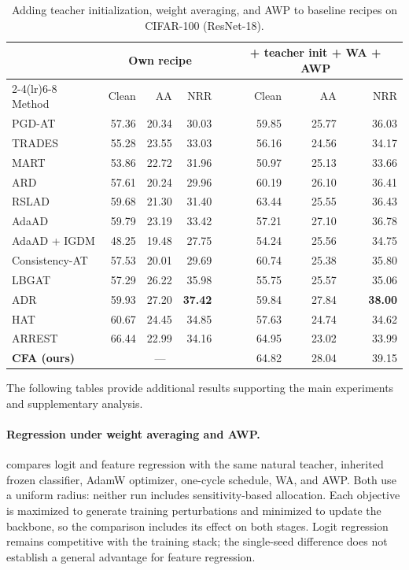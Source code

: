 \begin{table}[!htbp]
  \centering
  \scriptsize
  \setlength{\tabcolsep}{4pt}
  \caption{
  Adding teacher initialization, weight averaging, and AWP to baseline
  recipes on CIFAR-100 (ResNet-18).
  }
  \label{tab:baselinestack}
  \begin{tabular}{lrrrcrrr}
    \toprule
    & \multicolumn{3}{c}{Own recipe}
    && \multicolumn{3}{c}{+ teacher init + WA + AWP} \\
    \cmidrule(lr){2-4}\cmidrule(lr){6-8}
    Method & Clean & AA & NRR && Clean & AA & NRR \\
    \midrule
    PGD-AT & 57.36 & 20.34 & 30.03
           && 59.85 & 25.77 & 36.03 \\
    TRADES & 55.28 & 23.55 & 33.03
           && 56.16 & 24.56 & 34.17 \\
    MART & 53.86 & 22.72 & 31.96
         && 50.97 & 25.13 & 33.66 \\
    ARD & 57.61 & 20.24 & 29.96
        && 60.19 & 26.10 & 36.41 \\
    RSLAD & 59.68 & 21.30 & 31.40
          && 63.44 & 25.55 & 36.43 \\
    AdaAD & 59.79 & 23.19 & 33.42
          && 57.21 & 27.10 & 36.78 \\
    AdaAD + IGDM & 48.25 & 19.48 & 27.75
                 && 54.24 & 25.56 & 34.75 \\
    Consistency-AT & 57.53 & 20.01 & 29.69
                   && 60.74 & 25.38 & 35.80 \\
    LBGAT & 57.29 & 26.22 & 35.98
          && 55.75 & 25.57 & 35.06 \\
    ADR & 59.93 & 27.20 & \textbf{37.42}
        && 59.84 & 27.84 & \textbf{38.00} \\
    HAT & 60.67 & 24.45 & 34.85
        && 57.63 & 24.74 & 34.62 \\
    ARREST & 66.44 & 22.99 & 34.16
           && 64.95 & 23.02 & 33.99 \\
    \midrule
    \textbf{CFA (ours)}
      & \multicolumn{3}{c}{---}
      && 64.82 & 28.04 & 39.15 \\
    \bottomrule
  \end{tabular}
\end{table}
\label{app:more}

The following tables provide additional results supporting the main experiments and supplementary
analysis.

\paragraph{Regression under weight averaging and AWP.}
 compares logit and feature regression with the same natural teacher,
inherited frozen classifier, AdamW optimizer, one-cycle schedule, WA, and AWP. Both use a uniform
radius: neither run includes sensitivity-based allocation. Each objective is maximized to generate
training perturbations and minimized to update the backbone, so the comparison includes its effect
on both stages. Logit regression remains competitive with the training stack; the single-seed
difference does not establish a general advantage for feature regression.

